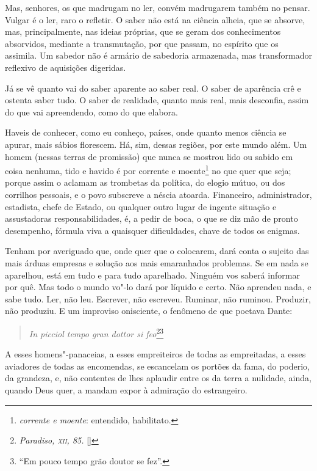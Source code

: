 Mas, senhores, os que madrugam no ler, convém madrugarem também no
pensar. Vulgar é o ler, raro o refletir. O saber não está na ciência
alheia, que se absorve, mas, principalmente, nas ideias próprias, que
se geram dos conhecimentos absorvidos, mediante a transmutação, por que
passam, no espírito que os assimila. Um sabedor não é armário de
sabedoria armazenada, mas transformador reflexivo de aquisições digeridas.

Já se vê quanto vai do saber aparente ao saber real. O saber de
aparência crê e ostenta saber tudo. O saber de realidade, quanto mais
real, mais desconfia, assim do que vai apreendendo, como do que elabora.

Haveis de conhecer, como eu conheço, países, onde quanto menos
ciência se apurar, mais sábios florescem. Há, sim, dessas regiões, por
este mundo além. Um homem (nessas terras de promissão) que nunca se
mostrou lido ou sabido em coisa nenhuma, tido e havido é por corrente e
moente\footnote{\textit{corrente e moente}: entendido, habilitato.} no que quer que seja; porque assim o aclamam as trombetas
da política, do elogio mútuo, ou dos corrilhos pessoais, e o povo
subscreve a néscia atoarda. Financeiro, administrador, estadista, chefe
de Estado, ou qualquer outro lugar de ingente situação e assustadoras
responsabilidades, é, a pedir de boca, o que se diz mão de pronto
desempenho, fórmula viva a quaisquer dificuldades, chave de todos os enigmas.

Tenham por averiguado que, onde quer que o colocarem, dará conta o
sujeito das mais árduas empresas e solução aos mais emaranhados
problemas. Se em nada se aparelhou, está em tudo e para tudo
aparelhado. Ninguém vos saberá informar por quê. Mas todo o mundo vo"-lo
dará por líquido e certo. Não aprendeu nada, e sabe tudo. Ler, não leu.
Escrever, não escreveu. Ruminar, não ruminou. Produzir, não produziu. E
um improviso onisciente, o fenômeno de que poetava Dante:

\begin{verse}
\textit{In picciol tempo gran dottor si feo}\footnote[*]{\emph{Paradiso, \textsc{xii}, 85.} []}\footnote{``Em pouco tempo grão doutor se fez''.}
\end{verse}
 

A esses homens"-panaceias, a esses empreiteiros de todas as
empreitadas, a esses aviadores de todas as encomendas, se escancelam os
portões da fama, do poderio, da grandeza, e, não contentes de lhes
aplaudir entre os da terra a nulidade, ainda, quando Deus quer, a
mandam expor à admiração do estrangeiro.

